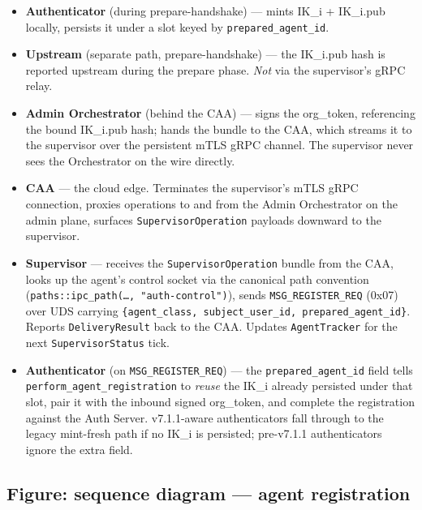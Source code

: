 \documentclass[11pt, a4paper]{article}
\newcommand{\code}[1]{\texttt{\small #1}}
\begin{document}
\begin{itemize}
  \item \textbf{Authenticator} (during prepare-handshake) --- mints
        IK\_i + IK\_i.pub locally, persists it under a slot keyed by
        \code{prepared\_agent\_id}.
  \item \textbf{Upstream} (separate path, prepare-handshake) --- the
        IK\_i.pub hash is reported upstream during the prepare phase.
        \emph{Not} via the supervisor's gRPC relay.
  \item \textbf{Admin Orchestrator} (behind the CAA) --- signs the
        org\_token, referencing the bound IK\_i.pub hash; hands the
        bundle to the CAA, which streams it to the supervisor over the
        persistent mTLS gRPC channel. The supervisor never sees the
        Orchestrator on the wire directly.
  \item \textbf{CAA} --- the cloud edge. Terminates the supervisor's
        mTLS gRPC connection, proxies operations to and from the Admin
        Orchestrator on the admin plane, surfaces
        \code{SupervisorOperation} payloads downward to the supervisor.
  \item \textbf{Supervisor} --- receives the \code{SupervisorOperation}
        bundle from the CAA, looks up the agent's control socket via
        the canonical path convention (\code{paths::ipc\_path(\dots, "auth-control")}),
        sends \code{MSG\_REGISTER\_REQ} (0x07) over UDS carrying
        \code{\{agent\_class, subject\_user\_id, prepared\_agent\_id\}}.
        Reports \code{DeliveryResult} back to the CAA. Updates
        \code{AgentTracker} for the next \code{SupervisorStatus} tick.
  \item \textbf{Authenticator} (on \code{MSG\_REGISTER\_REQ}) --- the
        \code{prepared\_agent\_id} field tells \code{perform\_agent\_registration}
        to \emph{reuse} the IK\_i already persisted under that slot, pair
        it with the inbound signed org\_token, and complete the
        registration against the Auth Server. v7.1.1-aware authenticators
        fall through to the legacy mint-fresh path if no IK\_i is
        persisted; pre-v7.1.1 authenticators ignore the extra field.
\end{itemize}

\subsection{Figure: sequence diagram --- agent registration}
\end{document}
